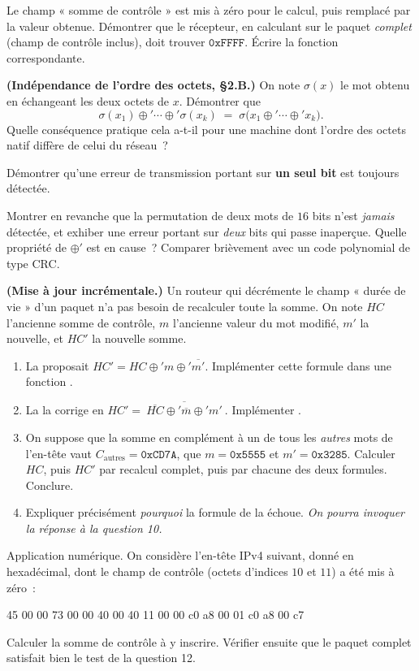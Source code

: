 \documentclass[11pt,a4paper]{article}
\begin{document}
\Q Le champ « somme de contrôle » est mis à zéro pour le calcul, puis remplacé par la valeur
obtenue. Démontrer que le récepteur, en calculant  sur le paquet
\emph{complet} (champ de contrôle inclus), doit trouver $\texttt{0xFFFF}$. Écrire la fonction
 correspondante.

\Q \textbf{(Indépendance de l'ordre des octets,  §2.B.)} On note
$\sigma(x)$ le mot obtenu en échangeant les deux octets de $x$. Démontrer que
\[ \sigma(x_1)\oplus'\cdots\oplus'\sigma(x_k) \;=\; \sigma\big(x_1\oplus'\cdots\oplus'
x_k\big). \]
Quelle conséquence pratique cela a-t-il pour une machine dont l'ordre des octets natif
diffère de celui du réseau~?

\Q Démontrer qu'une erreur de transmission portant sur \textbf{un seul bit} est toujours
détectée.

\Q Montrer en revanche que la permutation de deux mots de $16$ bits n'est \emph{jamais}
détectée, et exhiber une erreur portant sur \emph{deux} bits qui passe inaperçue. Quelle
propriété de $\oplus'$ est en cause~? Comparer brièvement avec un code polynomial de type
CRC.

\Q \textbf{(Mise à jour incrémentale.)} Un routeur qui décrémente le champ « durée de vie »
d'un paquet n'a pas besoin de recalculer toute la somme. On note $HC$ l'ancienne somme de
contrôle, $m$ l'ancienne valeur du mot modifié, $m'$ la nouvelle, et $HC'$ la nouvelle somme.
\begin{enumerate}[label=(\alph*),leftmargin=2em,itemsep=1pt]
\item La  proposait $HC' = HC\oplus' m\oplus'\overline{m'}$. Implémenter cette
formule dans une fonction .
\item La  la corrige en $HC' = \overline{\ \overline{HC}\oplus'\overline{m}\oplus'
m'\ }$. Implémenter .
\item On suppose que la somme en complément à un de tous les \emph{autres} mots de l'en-tête
vaut $C_{\text{autres}}=\texttt{0xCD7A}$, que $m=\texttt{0x5555}$ et
$m'=\texttt{0x3285}$. Calculer $HC$, puis $HC'$ par recalcul complet, puis par chacune des
deux formules. Conclure.
\item Expliquer précisément \emph{pourquoi} la formule de la  échoue. \emph{On
pourra invoquer la réponse à la question 10.}
\end{enumerate}

\Q Application numérique. On considère l'en-tête IPv4 suivant, donné en hexadécimal, dont le
champ de contrôle (octets d'indices $10$ et $11$) a été mis à zéro~:
\begin{center}\ttfamily\small
45 00 00 73 00 00 40 00 40 11 00 00 c0 a8 00 01 c0 a8 00 c7
\end{center}
Calculer la somme de contrôle à y inscrire. Vérifier ensuite que le paquet complet satisfait
bien le test de la question 12.
\end{document}
